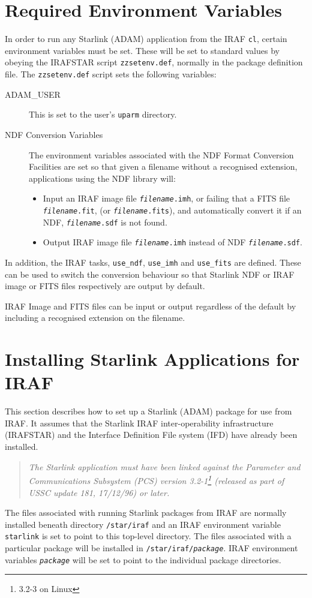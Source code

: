\documentclass[twoside,11pt]{article}
\newcommand{\htmlref}[2]{#1}
\newcommand{\xref}[3]{#1}
\newcommand{\xlabel}[1]{}
\newcommand{\itfile}[2]{\texttt{\textit{#1}#2}}
\newcommand{\cl}{\texttt{cl}}
\begin{document}
\section{\xlabel{required_environment_variables}Required Environment Variables}
In order to run any Starlink (ADAM) application from the IRAF \cl, certain
environment variables must be set. These will be set to standard values by
obeying the IRAFSTAR script \texttt{zzsetenv.def}, normally in the 
\htmlref{package definition file}
{pkg_def_files}.
The \texttt{zzsetenv.def} script sets the following variables:
\begin{description}
\item[ADAM\_USER] This is set to the user's \texttt{uparm} directory.
\item[NDF Conversion Variables] The environment variables associated with the
\xref{NDF Format Conversion Facilities}{ssn20}{}
are set so that given a filename without a recognised extension, applications 
using the NDF library will:
\begin{itemize}
\item Input an IRAF image file \itfile{filename}{.imh},
or failing that a FITS file \itfile{filename}{.fit},
(or \itfile{filename}{.fits}),
and automatically convert it if an NDF,
\itfile{filename}{.sdf} is not found.
\item Output IRAF image file \itfile{filename}{.imh} instead of NDF 
\itfile{filename}{.sdf}.
\end{itemize}
\end{description}
In addition, the IRAF tasks, \texttt{use\_ndf}, \texttt{use\_imh} and
\texttt{use\_fits} are defined.
These can be used to switch the conversion behaviour so that Starlink NDF or 
IRAF image or FITS files respectively are output by default.

IRAF Image and FITS files can be input or output regardless of the default by
including a recognised extension on the filename.

\section{\xlabel{installing_starlink_applications_for_iraf}\label{installing}Installing Starlink Applications for IRAF}
This section describes how to set up a Starlink (ADAM) package for use from 
IRAF. 
It assumes that the Starlink IRAF inter-operability infrastructure (IRAFSTAR)
and the Interface Definition File system (IFD) have already been installed.
\begin{quote}
\emph{The Starlink application must have been linked against the Parameter
and Communications Subsystem (PCS) version 3.2-1\footnote{3.2-3 on Linux}
(released as part of USSC update 181, 17/12/96) or later.}
\end{quote}
The files associated with running Starlink packages from IRAF are normally 
installed beneath directory \texttt{/star/iraf} and an IRAF environment
variable \texttt{starlink} is set to point to this top-level directory. 
The files associated with a particular package will be installed in 
\texttt{/star/iraf/\textit{package}}. 
IRAF environment variables \texttt{\textit{package}}
will be set to point to the individual package directories.
\end{document}
